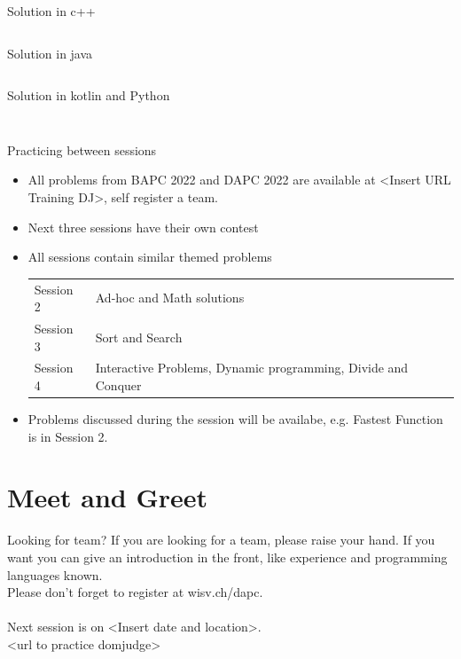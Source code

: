 \documentclass[11pt,pdf, aspectratio=169]{beamer}
\begin{document}
  \begin{frame}[containsverbatim]{Solution in c++}
    \inputminted{c++}{code/session-1/c++/dapc-f.cpp}
  \end{frame}
  \begin{frame}[containsverbatim]{Solution in java}
    \inputminted{java}{code/session-1/java/dapc-f.java}
  \end{frame}
  \begin{frame}[containsverbatim]{Solution in kotlin and Python}
    \inputminted{kotlin}{code/session-1/kotlin/dapc-f.kt}
    \inputminted{python}{code/session-1/python/dapc-f.py}
  \end{frame}
  \begin{frame}{Practicing between sessions}
    \begin{itemize}
      \item All problems from BAPC 2022 and DAPC 2022 are available at <Insert URL Training DJ>, self register a team.
      \item Next three sessions have their own contest
      \item All sessions contain similar themed problems\\ \begin{tabular}{ll}
                                                             \hline
                                                             Session 2 & Ad-hoc and Math solutions                                     \\
                                                             Session 3 & Sort and Search                                               \\
                                                             Session 4 & Interactive Problems, Dynamic programming, Divide and Conquer \\
                                                             \hline
      \end{tabular}
      \item Problems discussed during the session will be availabe, e.g. Fastest Function is in Session 2.
    \end{itemize}
  \end{frame}
  \section{Meet and Greet}
  \begin{frame}{Looking for team?}
    If you are looking for a team, please raise your hand.
    If you want you can give an introduction in the front, like experience and programming languages known.\\
    Please don't forget to register at wisv.ch/dapc.\\\\
    Next session is on <Insert date and location>.\\

    <url to practice domjudge>
  \end{frame}
\end{document}
